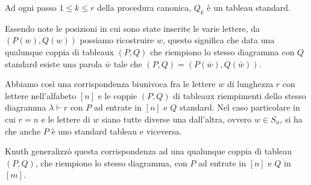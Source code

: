 \begin{oss}
Ad ogni passo $1 \leq k \leq r$ della procedura canonica, $Q_k$ \`e un
tableau standard.
\end{oss}

Essendo note le posizioni in cui sono state inserite le varie lettere,
da $(P(w),Q(w))$ possiamo ricostruire $w$, questo significa che data
una qualunque coppia di tableaux $(P,Q)$ che riempiono lo stesso
diagramma con $Q$ standard esiste una parola $\bar w$ tale che
$(P,Q)=(P(\bar w),Q(\bar w))$.

Abbiamo cos\`i una corrispondenza
biunivoca fra le lettere $w$ di lunghezza $r$ con lettere
nell'alfabeto $[n]$ e le coppie $(P,Q)$ di tableaux riempimenti dello
stesso diagramma $\lambda \vdash r$ con $P$ ad entrate in $[n]$ e $Q$
standard. Nel caso particolare in cui $r=n$ e le lettere di $w$ siano
tutte diverse una dall'altra, ovvero $w \in S_n$, si ha che anche $P$
\`e uno standard tableau e viceversa.

Knuth generalizz\`o questa corrispondenza ad una qualunque coppia di
tableau $(P,Q)$, che riempiono lo stesso diagramma, con $P$ ad entrate
in $[n]$ e $Q$ in $[m]$.
